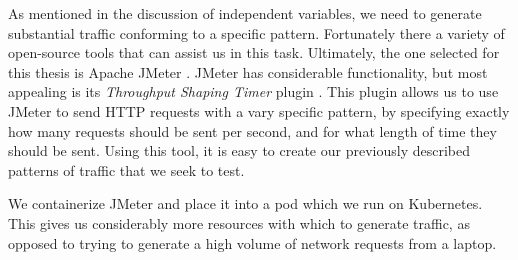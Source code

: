 As mentioned in the discussion of independent variables, we need to generate
substantial traffic conforming to a specific pattern. Fortunately there a
variety of open-source tools that can assist us in this task. Ultimately, the
one selected for this thesis is Apache JMeter \cite{apache-jmeter}. JMeter has
considerable functionality, but most appealing is its \textit{Throughput Shaping
Timer} plugin \cite{throughput-shaping-timer-plugin}. This plugin allows us to
use JMeter to send HTTP requests with a vary specific pattern, by specifying
exactly how many requests should be sent per second, and for what length of time
they should be sent. Using this tool, it is easy to create our previously
described patterns of traffic that we seek to test.

We containerize JMeter and place it into a pod which we run on Kubernetes. This
gives us considerably more resources with which to generate traffic, as opposed
to trying to generate a high volume of network requests from a laptop.
